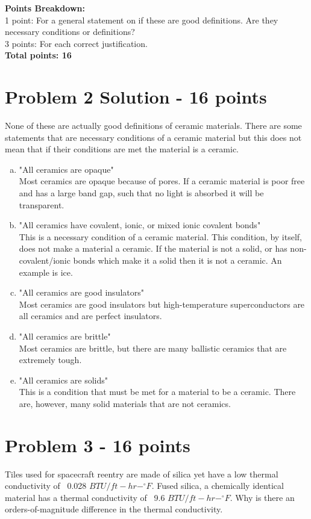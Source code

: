 \documentclass[12pt,letterpaper]{article}
\begin{document}
\textbf{Points Breakdown:}\\[12pt]
1 point: For a general statement on if these are good definitions. Are they necessary conditions or definitions?\\
3 points: For each correct justification.\\[6pt]
\textbf{Total points: 16}

\section*{Problem 2 Solution - 16 points}
None of these are actually good definitions of ceramic materials. There are some statements that are necessary conditions of a ceramic material but this does not mean that if their conditions are met the material is a ceramic.

\begin{enumerate}[(a)]
    \item "All ceramics are opaque"\\[0.2 cm]
    Most ceramics are opaque because of pores. If a ceramic material is poor free and has a large band gap, such that no light is absorbed it will be transparent.
    \item "All ceramics have covalent, ionic, or mixed ionic covalent bonds"\\[0.2 cm]
    This is a necessary condition of a ceramic material. This condition, by itself, does not make a material a ceramic. If the material is not a solid, or has non-covalent/ionic bonds which make it a solid then it is not a ceramic. An example is ice.
    \item "All ceramics are good insulators"\\[0.2 cm]
    Most ceramics are good insulators but high-temperature superconductors are all ceramics and are perfect insulators. 
    \item "All ceramics are brittle"\\[0.2 cm]
    Most ceramics are brittle, but there are many ballistic ceramics that are extremely tough.
    \item "All ceramics are solids" \\[0.2 cm]
    This is a condition that must be met for a material to be a ceramic. There are, however, many solid materials that are not ceramics.
\end{enumerate}


\newpage
\section*{Problem 3 - 16 points}
Tiles used for spacecraft reentry are made of silica yet have a low thermal conductivity of ~0.028 $BTU/ft-hr-^{\circ}F$. Fused silica, a chemically identical material has a thermal conductivity of ~9.6 $BTU/ft-hr-^{\circ}F$. Why is there an orders-of-magnitude difference in the thermal conductivity. 
\end{document}
